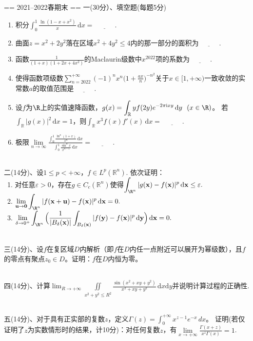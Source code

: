== 2021--2022春期末 ==
一(30分）、填空题(每题5分)
\begin{enumerate}[label=(\arabic*)]
\item 积分$\displaystyle \int_0^1 \frac{\ln(1-x+x^2)}{x} \,\mathrm{d}x=\underline{\qquad\quad}$.
\item 曲面$z=x^2+2y^2$落在区域$x^2+4y^2\le 4$内的那一部分的面积为$\underline{\qquad\quad}$.
\item 函数$\displaystyle \frac{1}{(1+x)(1+2x+4x^2)}$的Maclaurin级数中$x^{2022}$项的系数为$\underline{\qquad\quad}$.
\item 使得函数项级数$\displaystyle \sum\limits_{n=2022}^{+\infty} (-1)^nx^n\Big(1+\frac{ax}{n}\Big)^{-n^2}$关于$x\in[1,+\infty)$一致收敛的实常数$a$的取值范围是$\underline{\qquad\quad}$.
\item 设$f$为$\R$上的实值速降函数，$\displaystyle g(x)=\int_\mathbb{R} yf(2y)e^{-2\pi \mathrm{i}xy} \,\mathrm{d}y\ \ (x\in\R)$。
若$\displaystyle \int_\mathbb{R}|g(x)|^2 \,\mathrm{d}x=1$，则$\displaystyle \int_\mathbb{R} x^3f(x)f'(x) \,\mathrm{d}x=\underline{\qquad\quad}$.
\item 极限$\lim\limits_{n\to\infty} \frac{\displaystyle \int_0^1 \frac{\ln^n(1+x)}{x^n} \,\mathrm{d}x}{\displaystyle \int_0^1 \frac{\sin^n x}{x^{n-1}} \,\mathrm{d}x}=\underline{\qquad\quad}$.
\end{enumerate}
~\\
二(14分)、设$1\leq p<+\infty$，$f\in L^p(\mathbb{R}^n)$. 依次证明：\\
\quad\ 1. 对任意$\varepsilon >0$，存在$g\in C_c(\mathbb{R}^n)$使得$\displaystyle \int_{\R^n}|g(\x)-f(\x)|^p\,\mathrm{d}\x\leq\varepsilon.$\\
\quad\ 2. $\displaystyle \lim_{\U\to\mathbf{0}}\int_{\R^n} |f(\x+\U)-f(\x)|^p\,\mathrm{d}\x =0.$\\
\quad\ 3. $\displaystyle \lim_{\delta\to0^+}\int_{\R^n} \Big(\frac{1}{|B_\delta(\x)|}\int_{B_\delta(\x)}|f(\y)-f(\x)|^p \,\mathrm{d}\y\Big)\,\mathrm{d}\x=0.$

~\\
三(14分)、设$f$在复区域$D$内解析（即$f$在$D$内任一点附近可以展开为幂级数），且$f$的零点有聚点$z_0\in D$。证明：$f$在$D$内恒为零。

~\\
四(14分)、计算$\displaystyle \lim_{R\to+\infty}\iint\limits_{x^2+y^2\le R^2} \frac{\sin(x^2+xy+y^2)}{x^2+xy+y^2} \,\mathrm{d}x\mathrm{d}y$并说明计算过程的正确性.

~\\
五(14分)、对于具有正实部的复数$z$，定义$\Gamma(z)=\int_0^{+\infty}x^{z-1}e^{-x}\,dx$。
证明(若仅证明了$z$为实数情形时的结果，计10分)：对任何复数$z$，有$\displaystyle \lim\limits_{x\to+\infty}\frac{\Gamma(x+z)}{x^z\Gamma(x)}=1$.

